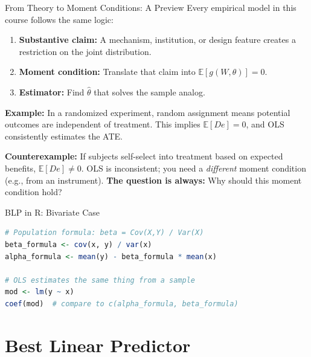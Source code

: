 \documentclass[aspectratio=169, handout, t]{beamer}
\numberwithin{equation}{section}
\begin{document}
\begin{frame}{From Theory to Moment Conditions: A Preview}
Every empirical model in this course follows the same logic:
\vspace{-2pt}
\begin{tcolorbox}[colback=blue!5, colframe=blue!50]
\begin{enumerate}
\item \textbf{Substantive claim:}  A mechanism, institution, or design feature creates a restriction on the joint distribution.
\item \textbf{Moment condition:}  Translate that claim into $\mathbb{E}[g(W, \theta)]=0$.
\item \textbf{Estimator:}  Find $\hat{\theta}$ that solves the sample analog.
\end{enumerate}
\end{tcolorbox}

\smallskip\pause
\textbf{Example:} In a randomized experiment, random assignment means potential outcomes are independent of treatment.  This implies $\mathbb{E}[De]=0$, and OLS consistently estimates the ATE.

\smallskip\pause
\textbf{Counterexample:} If subjects self-select into treatment based on expected benefits, $\mathbb{E}[De]\neq 0$.  OLS is inconsistent; you need a \emph{different} moment condition (e.g., from an instrument).
\textbf{The question is always:} \alert{Why should this moment condition hold?}
\end{frame}


\begin{frame}[fragile]{BLP in R: Bivariate Case}
\begin{lstlisting}[language=R]
# Population formula: beta = Cov(X,Y) / Var(X)
beta_formula <- cov(x, y) / var(x)
alpha_formula <- mean(y) - beta_formula * mean(x)

# OLS estimates the same thing from a sample
mod <- lm(y ~ x)
coef(mod)  # compare to c(alpha_formula, beta_formula)
\end{lstlisting}
\end{frame}


\section{Best Linear Predictor}
\end{document}
